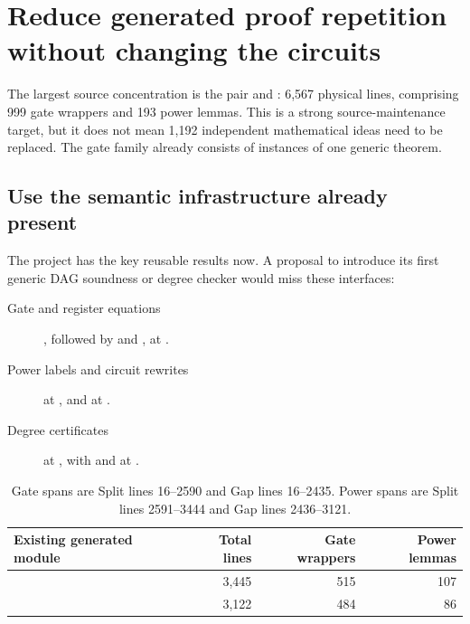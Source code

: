 \majorbreak
\section{Reduce generated proof repetition without changing the circuits}
\label{sec:circuits}

The largest source concentration is the pair 
and : 6,567 physical lines, comprising 999 gate
wrappers and 193 power lemmas. This is a strong source-maintenance target,
but it does not mean 1,192 independent mathematical ideas need to be replaced.
The gate family already consists of instances of one generic theorem.

\subsection{Use the semantic infrastructure already present}

The project has the key reusable results now. A proposal to introduce its
first generic DAG soundness or degree checker would miss these interfaces:

\begin{description}
\item[Gate and register equations]
, followed by 
and , at
.
\item[Power labels and circuit rewrites]
 at , and
 at
.
\item[Degree certificates]
 at ,
with  and  at
.
\end{description}

\begin{table}[h]
\small
\begin{tabularx}{\linewidth}{@{}Yrrr@{}}
\toprule
Existing generated module & Total lines & Gate wrappers & Power lemmas\\
\midrule
{} & 3,445 & 515 & 107\\
 & 3,122 & 484 & 86\\
\bottomrule
\end{tabularx}
\caption{Gate spans are Split lines 16--2590 and Gap lines 16--2435.
Power spans are Split lines 2591--3444 and Gap lines 2436--3121.}
\end{table}

